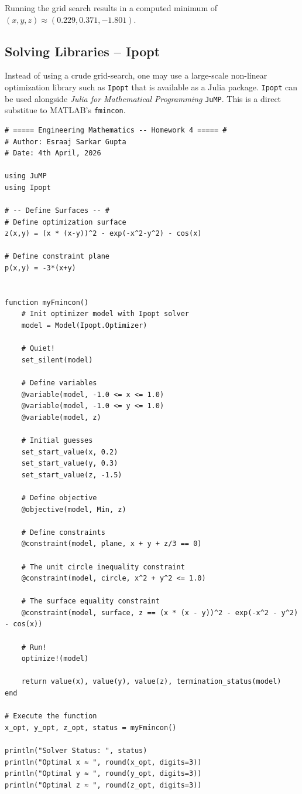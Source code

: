 \documentclass{article}
\begin{document}
Running the grid search results in a computed minimum of $ (x, y, z) \approx (0.229, 0.371, -1.801)$.

\subsection{Solving Libraries -- Ipopt}
Instead of using a crude grid-search, one may use a large-scale non-linear optimization library such as \texttt{Ipopt} that is available as a Julia package. \texttt{Ipopt} can be used alongside \textit{Julia for Mathematical Programming} \texttt{JuMP}. This is a direct substitue to MATLAB's \texttt{fmincon}.

\begin{verbatim}
# ===== Engineering Mathematics -- Homework 4 ===== #
# Author: Esraaj Sarkar Gupta
# Date: 4th April, 2026

using JuMP
using Ipopt

# -- Define Surfaces -- #
# Define optimization surface
z(x,y) = (x * (x-y))^2 - exp(-x^2-y^2) - cos(x)

# Define constraint plane
p(x,y) = -3*(x+y)


function myFmincon()
    # Init optimizer model with Ipopt solver
    model = Model(Ipopt.Optimizer)
    
    # Quiet!
    set_silent(model)

    # Define variables
    @variable(model, -1.0 <= x <= 1.0)
    @variable(model, -1.0 <= y <= 1.0)
    @variable(model, z)

    # Initial guesses
    set_start_value(x, 0.2)
    set_start_value(y, 0.3)
    set_start_value(z, -1.5)

    # Define objective
    @objective(model, Min, z)

    # Define constraints
    @constraint(model, plane, x + y + z/3 == 0)
    
    # The unit circle inequality constraint
    @constraint(model, circle, x^2 + y^2 <= 1.0)
    
    # The surface equality constraint
    @constraint(model, surface, z == (x * (x - y))^2 - exp(-x^2 - y^2) - cos(x))

    # Run!
    optimize!(model)

    return value(x), value(y), value(z), termination_status(model)
end

# Execute the function
x_opt, y_opt, z_opt, status = myFmincon()

println("Solver Status: ", status)
println("Optimal x ≈ ", round(x_opt, digits=3))
println("Optimal y ≈ ", round(y_opt, digits=3))
println("Optimal z ≈ ", round(z_opt, digits=3))
\end{verbatim}
\end{document}
